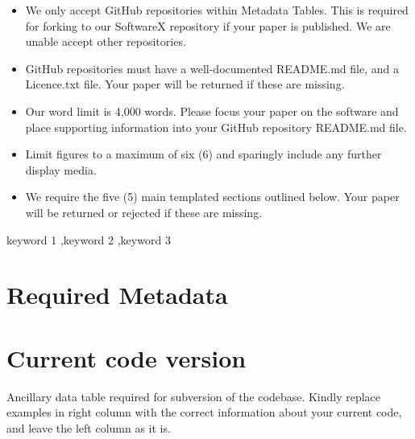 \documentclass[preprint,12pt, a4paper]{elsarticle}
\begin{document}
\begin{frontmatter}
\begin{itemize}
    
    \begin{itemize} 
    	\item We only accept GitHub repositories within Metadata Tables. This is required for forking to our SoftwareX repository if your paper is published. We are unable accept other repositories.
        \item GitHub repositories must have a well-documented README.md file, and a Licence.txt file. Your paper will be returned if these are missing.
        \item Our word limit is 4,000 words. Please focus your paper on the software and place supporting information into your GitHub repository README.md file.
        \item Limit figures to a maximum of six (6) and sparingly include any further display media.
        \item We require the five (5) main templated sections outlined below. Your paper will be returned or rejected if these are missing.
	\end{itemize}
\end{itemize}
\begin{abstract}
Ca. 100 words

\end{abstract}

\begin{keyword}
keyword 1 \sep keyword 2 \sep keyword 3



\end{keyword}

\end{frontmatter}


\section*{Required Metadata}
\label{}

\section*{Current code version}
\label{}

Ancillary data table required for subversion of the codebase. Kindly replace examples in right column with the correct information about your current code, and leave the left column as it is.
\end{document}
